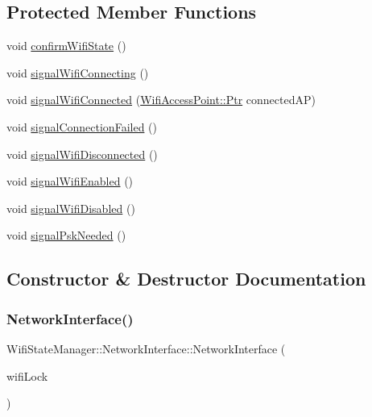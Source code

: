 \subsection*{Protected Member Functions}
\begin{DoxyCompactItemize}
\item 
void \mbox{\hyperlink{classWifiStateManager_1_1NetworkInterface_a0d4037e930a96b9458486f619725b480}{confirm\+Wifi\+State}} ()
\item 
void \mbox{\hyperlink{classWifiStateManager_1_1NetworkInterface_a3ce3bfd90ed3f746ab1c4b9f73c97495}{signal\+Wifi\+Connecting}} ()
\item 
void \mbox{\hyperlink{classWifiStateManager_1_1NetworkInterface_af7a140260780ce451d022e19329494a2}{signal\+Wifi\+Connected}} (\mbox{\hyperlink{classWifiAccessPoint_ad18977f884076774803027efbaa131a0}{Wifi\+Access\+Point\+::\+Ptr}} connected\+AP)
\item 
void \mbox{\hyperlink{classWifiStateManager_1_1NetworkInterface_a998596cc24e160b1c13de43b17e104c6}{signal\+Connection\+Failed}} ()
\item 
void \mbox{\hyperlink{classWifiStateManager_1_1NetworkInterface_a240d4a02fabfd92c6384fc404d979aac}{signal\+Wifi\+Disconnected}} ()
\item 
void \mbox{\hyperlink{classWifiStateManager_1_1NetworkInterface_aa97315b54f7a73f1643823856fbf50c7}{signal\+Wifi\+Enabled}} ()
\item 
void \mbox{\hyperlink{classWifiStateManager_1_1NetworkInterface_a523c3139b607afe2fb92d66218c1b88d}{signal\+Wifi\+Disabled}} ()
\item 
void \mbox{\hyperlink{classWifiStateManager_1_1NetworkInterface_a88b943e2cf2e694e40ee84974f09fb22}{signal\+Psk\+Needed}} ()
\end{DoxyCompactItemize}


\subsection{Constructor \& Destructor Documentation}
\mbox{\label{classWifiStateManager_1_1NetworkInterface_a5b438ba9ecda0b255916ff1ab160d457}} 
\subsubsection{\texorpdfstring{Network\+Interface()}{NetworkInterface()}}
{\footnotesize\ttfamily Wifi\+State\+Manager\+::\+Network\+Interface\+::\+Network\+Interface (\begin{DoxyParamCaption}\item[{Critical\+Section \&}]{wifi\+Lock }\end{DoxyParamCaption})}


